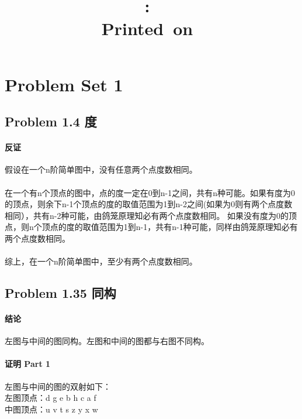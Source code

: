 \documentclass[17pt,UTF-8,a4paper]{ctexart}
\title{
    \vspace{2in}
    \textmd{\textbf{\hmwkClass:\ \hmwkTitle}}\\
    \normalsize\vspace{0.1in}\small{Printed\ on\ \hmwkDueDate}\\
    \vspace{0.1in}\large{\textit{\hmwkClassInstructor}}
    \vspace{3in}
}
\author{\hmwkAuthorName}
\date{}
\begin{document}


\section*{Problem Set 1}

\subsection*{Problem 1.4 度}
\paragraph*{反证}
假设在一个n阶简单图中，没有任意两个点度数相同。

\paragraph*{}
在一个有n个顶点的图中，点的度一定在0到n-1之间，共有n种可能。如果有度为0的顶点，则余下n-1个顶点的度的取值范围为1到n-2之间(如果为0则有两个点度数相同），共有n-2种可能，由鸽笼原理知必有两个点度数相同。
如果没有度为0的顶点，则n个顶点的度的取值范围为1到n-1，共有n-1种可能，同样由鸽笼原理知必有两个点度数相同。
\paragraph*{}
综上，在一个n阶简单图中，至少有两个点度数相同。


\subsection*{Problem 1.35 同构}




\paragraph*{结论}
左图与中间的图同构。左图和中间的图都与右图不同构。

\paragraph*{证明 Part 1}
左图与中间的图的双射如下：\\
左图顶点：d g e b h c a f\\
中图顶点：u v t s z y x w 
\end{document}
